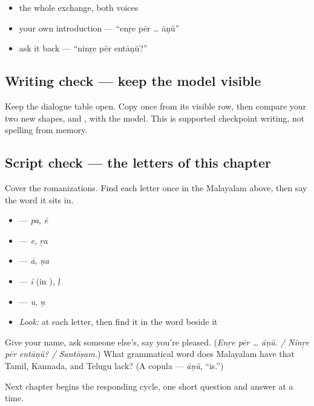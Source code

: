 \begin{itemize}
\raggedright
  \item the whole exchange, both voices
  \item your own introduction — \textquotedblleft{}enṟe pēr … āṇŭ\textquotedblright{}
  \item ask it back — \textquotedblleft{}ninṟe pēr entāṇŭ?\textquotedblright{}
\end{itemize}

\subsection*{Writing check — keep the model visible}
Keep the dialogue table open. Copy \textbf{} once from its visible row, then compare your two new shapes, \textbf{} and \textbf{}, with the model. This is supported checkpoint writing, not spelling from memory.

\subsection*{Script check — the letters of this chapter}
Cover the romanizations. Find each letter once in the Malayalam above, then say the word it sits in.

\begin{itemize}
\raggedright
  \item \textbf{} — \textbf{} \emph{pa}, \textbf{} \emph{ē}
  \item \textbf{} — \textbf{} \emph{e}, \textbf{} \emph{ṟa}
  \item \textbf{} — \textbf{} \emph{ā}, \textbf{} \emph{ṇa}
  \item \textbf{} — \textbf{} \emph{ī} (in \textbf{}), \textbf{} \emph{ḷ}
  \item \textbf{} — \textbf{} \emph{u}, \textbf{} \emph{ṇ}
\end{itemize}

\begin{itemize}
\raggedright
  \item \emph{Look:} at each letter, then find it in the word beside it
\end{itemize}

\begin{tcolorbox}[breakable,colback=teal!4,colframe=teal!35!black,title={Before you move on}]
Give your name, ask someone else's, say you're pleased. (\emph{Enṟe pēr … āṇŭ. / Ninṟe pēr entāṇŭ? / Santōṣam.}) What grammatical word does Malayalam have that Tamil, Kannada, and Telugu lack? (A copula — \emph{āṇŭ}, \textquotedblleft{}is.\textquotedblright{})

Next chapter begins the responding cycle, one short question and answer at a time.
\end{tcolorbox}
